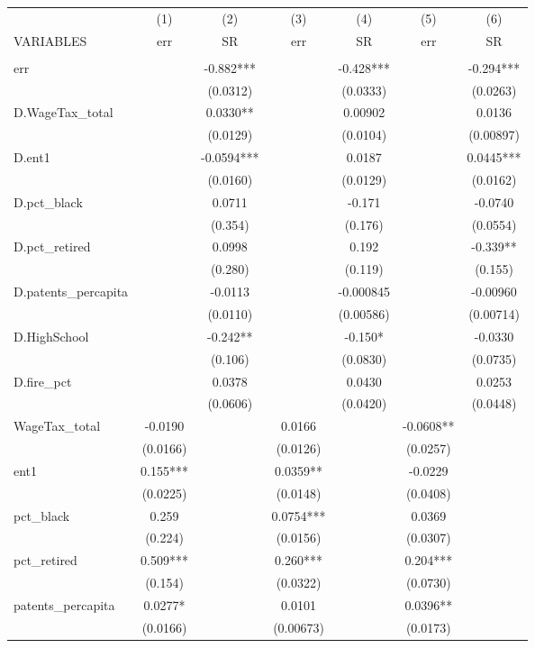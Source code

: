 \begin{tabular}{lcccccc} \hline
 & (1) & (2) & (3) & (4) & (5) & (6) \\
VARIABLES & err & SR & err & SR & err & SR \\ \hline
 &  &  &  &  &  &  \\
err &  & -0.882*** &  & -0.428*** &  & -0.294*** \\
 &  & (0.0312) &  & (0.0333) &  & (0.0263) \\
D.WageTax\_total &  & 0.0330** &  & 0.00902 &  & 0.0136 \\
 &  & (0.0129) &  & (0.0104) &  & (0.00897) \\
D.ent1 &  & -0.0594*** &  & 0.0187 &  & 0.0445*** \\
 &  & (0.0160) &  & (0.0129) &  & (0.0162) \\
D.pct\_black &  & 0.0711 &  & -0.171 &  & -0.0740 \\
 &  & (0.354) &  & (0.176) &  & (0.0554) \\
D.pct\_retired &  & 0.0998 &  & 0.192 &  & -0.339** \\
 &  & (0.280) &  & (0.119) &  & (0.155) \\
D.patents\_percapita &  & -0.0113 &  & -0.000845 &  & -0.00960 \\
 &  & (0.0110) &  & (0.00586) &  & (0.00714) \\
D.HighSchool &  & -0.242** &  & -0.150* &  & -0.0330 \\
 &  & (0.106) &  & (0.0830) &  & (0.0735) \\
D.fire\_pct &  & 0.0378 &  & 0.0430 &  & 0.0253 \\
 &  & (0.0606) &  & (0.0420) &  & (0.0448) \\
WageTax\_total & -0.0190 &  & 0.0166 &  & -0.0608** &  \\
 & (0.0166) &  & (0.0126) &  & (0.0257) &  \\
ent1 & 0.155*** &  & 0.0359** &  & -0.0229 &  \\
 & (0.0225) &  & (0.0148) &  & (0.0408) &  \\
pct\_black & 0.259 &  & 0.0754*** &  & 0.0369 &  \\
 & (0.224) &  & (0.0156) &  & (0.0307) &  \\
pct\_retired & 0.509*** &  & 0.260*** &  & 0.204*** &  \\
 & (0.154) &  & (0.0322) &  & (0.0730) &  \\
patents\_percapita & 0.0277* &  & 0.0101 &  & 0.0396** &  \\
 & (0.0166) &  & (0.00673) &  & (0.0173) &  \\

\end{tabular}
